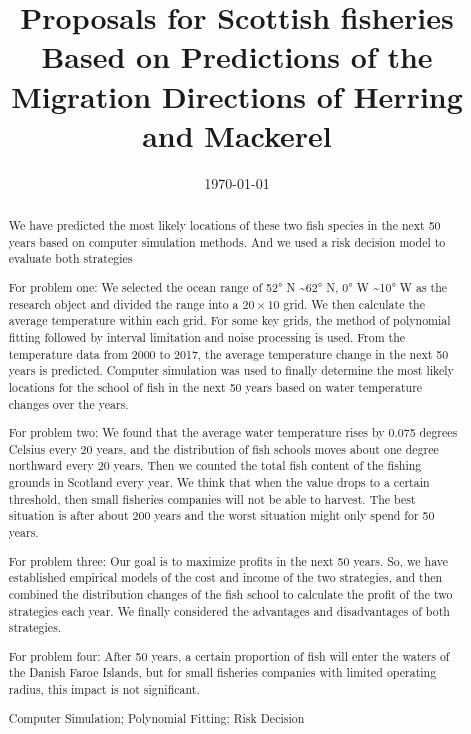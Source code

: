 \documentclass{mcmthesis}
\title{\large Proposals for Scottish fisheries Based on Predictions of the Migration Directions of Herring and Mackerel}
\author{}
\date{\today}
\numberwithin{figure}{section}
\numberwithin{table}{section}
\begin{document}
\begin{abstract}
  We have predicted the most likely locations of these two fish species in the next 50 years based on computer simulation methods. And we used a risk decision model to evaluate both strategies 
  
  For problem one: We selected the ocean range of \ang{52} N \textasciitilde \ang{62} N, \ang{0} W \textasciitilde \ang{10} W as the research object and divided the range into a $20 \times 10$ grid. We then calculate the average temperature within each grid. For some key grids, the method of polynomial fitting followed by interval limitation and noise processing is used. From the temperature data from 2000 to 2017, the average temperature change in the next 50 years is predicted. 
  Computer simulation was used to finally determine the most likely locations for the school of fish in the next 50 years based on water
temperature changes over the years.

  For problem two: We found that the average water temperature rises by 0.075 degrees Celsius every 20 years, and the distribution of fish schools moves about one degree northward every 20 years. Then we counted the total fish content of the fishing grounds in Scotland every year. We think that when the value drops to a certain threshold, then small fisheries companies will not be able to harvest. The best situation is after about 200 years and the worst situation might only spend for 50 years.
  
  For problem three: Our goal is to maximize profits in the next 50 years. So, we have established empirical models of the cost and income of the two strategies, and then combined the distribution changes of the fish school to calculate the profit of the two strategies each year. We finally considered the advantages and disadvantages of both strategies. 
  
  For problem four: After 50 years, a certain proportion of fish will enter the waters of the Danish Faroe Islands, but for small fisheries companies with limited operating radius, this impact is not significant.
  
\begin{keywords}
Computer Simulation; Polynomial Fitting; Risk Decision
\end{keywords}
\end{abstract}
\maketitle
\pagestyle{empty}
\newpage                                                          %
\begin{adjustwidth}{-1cm}{0cm}

\setcounter{tocdepth}{3}
\thispagestyle{empty}
\tableofcontents                                                  %

\end{adjustwidth}
\end{document}
